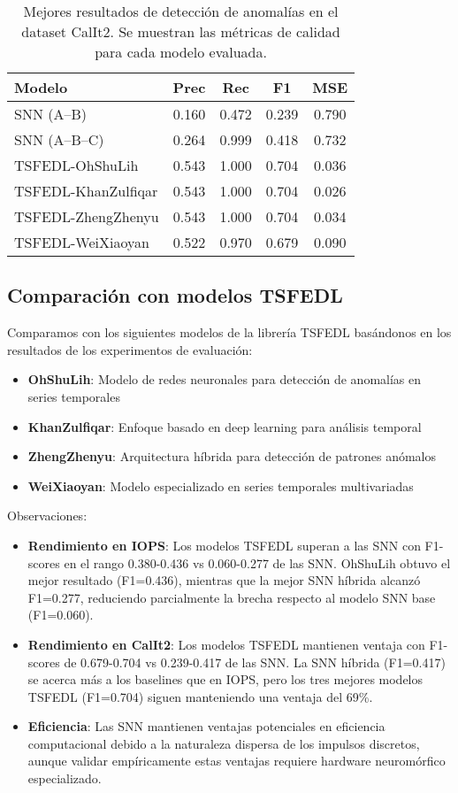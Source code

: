 \begin{table}[htbp]
\centering
\small
\begin{tabular}{lcccc}
\hline\hline
\textbf{Modelo} & \textbf{Prec} & \textbf{Rec} & \textbf{F1} & \textbf{MSE} \\
\hline
SNN (A--B) & 0.160 & 0.472 & 0.239 & 0.790 \\
SNN (A--B--C) & 0.264 & 0.999 & 0.418 & 0.732 \\
TSFEDL-OhShuLih & 0.543 & 1.000 & 0.704 & 0.036 \\
TSFEDL-KhanZulfiqar & 0.543 & 1.000 & 0.704 & 0.026 \\
TSFEDL-ZhengZhenyu & 0.543 & 1.000 & 0.704 & 0.034 \\
TSFEDL-WeiXiaoyan & 0.522 & 0.970 & 0.679 & 0.090 \\
\hline\hline
\end{tabular}
\caption{Mejores resultados de detección de anomalías en el dataset CalIt2. Se muestran las métricas de calidad para cada modelo evaluada.}
\label{tab:resultados-iops}
\end{table}

\subsection{Comparación con modelos TSFEDL}
Comparamos con los siguientes modelos de la librería TSFEDL basándonos en los resultados de los experimentos de evaluación:
\begin{itemize}
    \item \textbf{OhShuLih}: Modelo de redes neuronales para detección de anomalías en series temporales
    \item \textbf{KhanZulfiqar}: Enfoque basado en deep learning para análisis temporal
    \item \textbf{ZhengZhenyu}: Arquitectura híbrida para detección de patrones anómalos
    \item \textbf{WeiXiaoyan}: Modelo especializado en series temporales multivariadas
\end{itemize}
Observaciones:
\begin{itemize}
    \item \textbf{Rendimiento en IOPS}: Los modelos TSFEDL superan a las SNN con F1-scores en el rango 0.380-0.436 vs 0.060-0.277 de las SNN. OhShuLih obtuvo el mejor resultado (F1=0.436), mientras que la mejor SNN híbrida alcanzó F1=0.277, reduciendo parcialmente la brecha respecto al modelo SNN base (F1=0.060).
    \item \textbf{Rendimiento en CalIt2}: Los modelos TSFEDL mantienen ventaja con F1-scores de 0.679-0.704 vs 0.239-0.417 de las SNN. La SNN híbrida (F1=0.417) se acerca más a los baselines que en IOPS, pero los tres mejores modelos TSFEDL (F1=0.704) siguen manteniendo una ventaja del 69\%.
    \item \textbf{Eficiencia}: Las SNN mantienen ventajas potenciales en eficiencia computacional debido a la naturaleza dispersa de los impulsos discretos, aunque validar empíricamente estas ventajas requiere hardware neuromórfico especializado.
\end{itemize}
